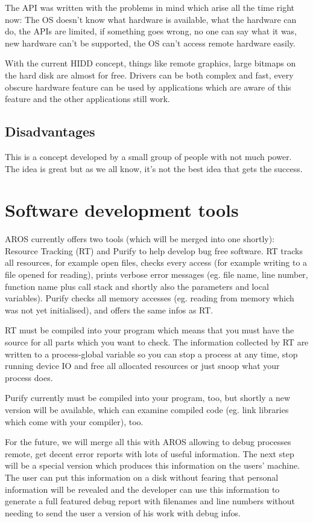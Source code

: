 The API was written with the problems in mind which arise all the time
right now: The OS doesn't know what hardware is available, what the
hardware can do, the APIs are limited, if something goes wrong, no
one can say what it was, new hardware can't be supported, the OS can't
access remote hardware easily.

With the current HIDD concept, things like remote graphics, large bitmaps
on the hard disk are almost for free. Drivers can be both complex and
fast, every obscure hardware feature can be used by applications which are
aware of this feature and the other applications still work.

\subsection{Disadvantages}

This is a concept developed by a small group of people with not much
power. The idea is great but as we all know, it's not the best idea
that gets the success.

\section{Software development tools}

AROS currently offers two tools (which will be merged into one shortly):
Resource Tracking (RT) and Purify to help develop bug free software. RT
tracks all resources, for example open files, checks every access (for
example writing to a file opened for reading), prints verbose error
messages (eg. file name, line number, function name plus call stack and
shortly also the parameters and local variables). Purify checks all
memory accesses (eg. reading from memory which was not yet initialised),
and offers the same infos as RT.

RT must be compiled into your program which means that you must have the
source for all parts which you want to check. The information collected
by RT are written to a process-global variable so you can stop a
process at any time, stop running device IO and free all allocated
resources or just snoop what your process does.

Purify currently must be compiled into your program, too, but shortly
a new version will be available, which can examine compiled code (eg.
link libraries which come with your compiler), too.

For the future, we will merge all this with AROS allowing to debug
processes remote, get decent error reports with lots of useful
information. The next step will be a special version which produces this
information on the users' machine. The user can put this information on
a disk without fearing that personal information will be revealed
and the developer can use this information to generate a full featured
debug report with filenames and line numbers without needing to
send the user a version of his work with debug infos.


